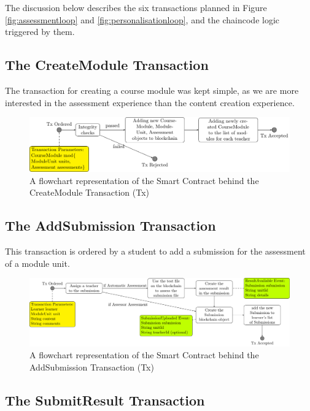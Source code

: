 The discussion below describes the six transactions planned in Figure \ref{fig:assessmentloop} and \ref{fig:personalisationloop}, 
and the chaincode logic triggered by them.

\subsection{The CreateModule Transaction}

The transaction for creating a course module was kept simple, as we are more interested in the assessment experience than the 
content creation experience.

\begin{figure}[!ht]
    \centering
    \includegraphics[width=1.0\textwidth]{cmtx}
    \caption{A flowchart representation of the Smart Contract behind the CreateModule Transaction (Tx)} \label{fig:cmtx}
\end{figure}

\subsection{The AddSubmission Transaction}

This transaction is ordered by a student to add a submission for the assessment of a module unit.

\begin{figure}[!ht]
    \centering
    \includegraphics[width=1.0\textwidth]{astx}
    \caption{A flowchart representation of the Smart Contract behind the AddSubmission Transaction (Tx)} \label{fig:astx}
\end{figure}

\subsection{The SubmitResult Transaction}

